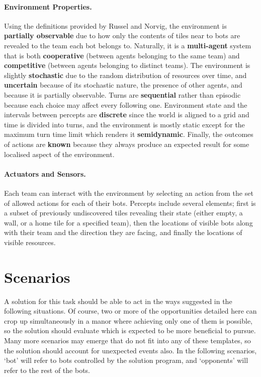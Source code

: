 \documentclass[a4paper,10pt]{article}
\begin{document}
\paragraph{Environment Properties.}
Using the definitions provided by Russel and Norvig\cite{norvig10}, the environment is \textbf{partially observable} due to how only the contents of tiles near to bots are revealed to the team each bot belongs to. Naturally, it is a \textbf{multi-agent} system that is both \textbf{cooperative} (between agents belonging to the same team) and \textbf{competitive} (between agents belonging to distinct teams). The environment is slightly \textbf{stochastic} due to the random distribution of resources over time, and \textbf{uncertain} because of its stochastic nature, the presence of other agents, and because it is partially observable. Turns are \textbf{sequential} rather than episodic because each choice may affect every following one. Environment state and the intervals between percepts are \textbf{discrete} since the world is aligned to a grid and time is divided into turns, and the environment is mostly static except for the maximum turn time limit which renders it \textbf{semidynamic}. Finally, the outcomes of actions are \textbf{known} because they always produce an expected result for some localised aspect of the environment.

\paragraph{Actuators and Sensors.}
Each team can interact with the environment by selecting an action from the set of allowed actions for each of their bots. Percepts include several elements; first is a subset of previously undiscovered tiles revealing their state (either empty, a wall, or a home tile for a specified team), then the locations of visible bots along with their team and the direction they are facing, and finally the locations of visible resources.

\section{Scenarios}
A solution for this task should be able to act in the ways suggested in the following situations. Of course, two or more of the opportunities detailed here can crop up simultaneously in a manor where achieving only one of them is possible, so the solution should evaluate which is expected to be more beneficial to pursue. Many more scenarios may emerge that do not fit into any of these templates, so the solution should account for unexpected events also. In the following scenarios, `bot' will refer to bots controlled by the solution program, and `opponents' will refer to the rest of the bots.
\end{document}

